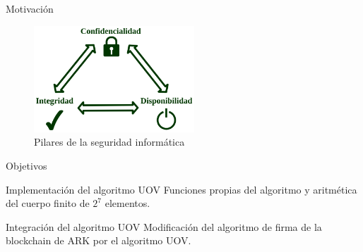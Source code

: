 \documentclass[10pt,aspectratio=169,]{beamer}
\begin{document}

\begin{frame}[c]{Motivación}
	\begin{figure}
		\centering
		\includegraphics[height=4cm]{CIA.png}
		\caption{Pilares de la seguridad informática}
	\end{figure}
\end{frame}

\begin{frame}[c]{Objetivos}
	\begin{exampleblock}{Implementación del algoritmo UOV}
		Funciones propias del algoritmo y aritmética del cuerpo finito de $2^7$ elementos.
	\end{exampleblock}

	\begin{exampleblock}{Integración del algoritmo UOV}
		Modificación del algoritmo de firma de la blockchain de ARK por el algoritmo UOV.
	\end{exampleblock}
\end{frame}
\end{document}
